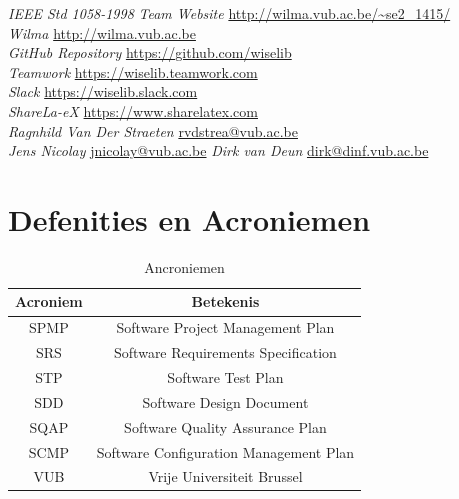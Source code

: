\begin{thebibliography}{9}
 \emph{IEEE Std 1058-1998}  
 \emph{Team Website} \url{http://wilma.vub.ac.be/~se2_1415/} \\
 \emph{Wilma} \url{http://wilma.vub.ac.be}\\
 \emph{GitHub Repository} \url{https://github.com/wiselib} \\
 \emph{Teamwork} \url{https://wiselib.teamwork.com} \\
 \emph{Slack} \url{https://wiselib.slack.com} \\
 \emph{ShareLa-eX} \url{https://www.sharelatex.com} \\

 \emph{Ragnhild Van Der Straeten} \href{mailto:rvdstrea@vub.ac.be}{rvdstrea@vub.ac.be} \\
 \emph{Jens Nicolay} \href{mailto:jnicolay@vub.ac.be}{jnicolay@vub.ac.be} 
 \emph{Dirk van Deun} \href{mailto:dirk@dinf.vub.ac.be}{dirk@dinf.vub.ac.be}
\end{thebibliography}

\section{Defenities en Acroniemen}

\begin{table}[h]
\centering
\begin{tabular}{c|c}
\textbf{Acroniem} & \textbf{Betekenis} \\
\hline
SPMP & Software Project Management Plan  \\
SRS & Software Requirements Specification \\
STP & Software Test Plan \\
SDD & Software Design Document \\
SQAP & Software Quality Assurance Plan \\
SCMP & Software Configuration Management Plan \\
VUB & Vrije Universiteit Brussel
\end{tabular}
\caption{Ancroniemen}
\label{tab:my_label}
\end{table}